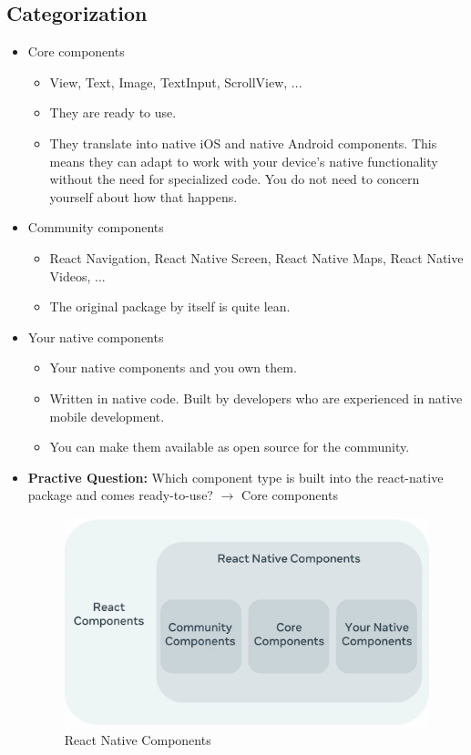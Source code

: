 \subsection{Categorization}
\begin{itemize}
    \item Core components
    \begin{itemize}[label=$\circ$]
        \item View, Text, Image, TextInput, ScrollView, ...
        \item They are ready to use.
        \item They translate into native iOS and native Android components. This means they can adapt to work with your device's native functionality without the need for specialized code. You do not need to concern yourself about how that happens.
    \end{itemize}
    \item Community components
    \begin{itemize}[label=$\circ$]
        \item React Navigation, React Native Screen, React Native Maps, React Native Videos, ...
        \item The original package by itself is quite lean. 
    \end{itemize}
    \item Your native components
    \begin{itemize}[label=$\circ$]
        \item Your native components and you own them.
        \item Written in native code. Built by developers who are experienced in native mobile development.
        \item You can make them available as open source for the community.
    \end{itemize}

    \item \textbf{Practive Question:} Which component type is built into the react-native package and comes ready-to-use?  
    $\rightarrow$ Core components

    \begin{figure}[H]
        \centering
        \includegraphics[width=0.5\linewidth]{images/react-native-compo.pdf}
        \caption{React Native Components}
    \end{figure}
\end{itemize}

